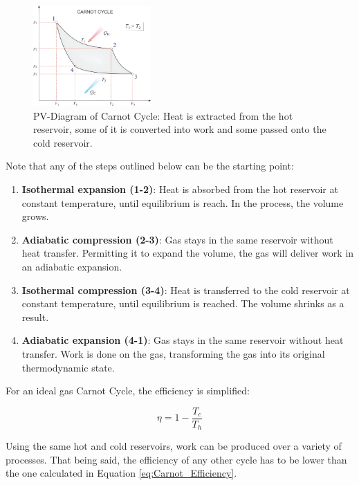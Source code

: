 \begin{figure}[H] %
    \centering
    \includegraphics[width=0.4\textwidth]{Graphics/Carnot_Cycle.png}  %
    \caption{PV-Diagram of Carnot Cycle: Heat is extracted from the hot reservoir, some of it is converted into work and some passed onto the cold reservoir. \cite{Eni}}
    \label{fig:Carnot_Cycle}
\end{figure}

Note that any of the steps outlined below can be the starting point: \cite{DINCER2018125}


\begin{enumerate}
    \item \textbf{Isothermal expansion (1-2)}: Heat is absorbed from the hot reservoir at constant temperature, until equilibrium is reach. In the process, the volume grows.
    \item \textbf{Adiabatic compression (2-3)}: Gas stays in the same reservoir without heat transfer. Permitting it to expand the volume, the gas will deliver work in an adiabatic expansion.
    \item \textbf{Isothermal compression (3-4)}: Heat is transferred to the cold reservoir at constant temperature, until equilibrium is reached. The volume shrinks as a result.
    \item \textbf{Adiabatic expansion (4-1)}: Gas stays in the same reservoir without heat transfer. Work is done on the gas, transforming the gas into its original thermodynamic state. 
\end{enumerate}

For an ideal gas Carnot Cycle, the efficiency is simplified: \cite{BARBIR201317}

\begin{equation}
\label{eq:Carnot_Efficiency}
    \mathit{\eta = 1 - \frac{T_c}{T_h}}
\end{equation}

Using the same hot and cold reservoirs, work can be produced over a variety of processes. That being said, the efficiency of any other cycle has to be lower than the one calculated in Equation \ref{eq:Carnot_Efficiency}.

